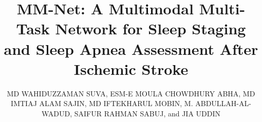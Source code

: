 \documentclass{ieeeaccess}
\begin{document}

\title{MM-Net: A Multimodal Multi-Task Network for Sleep Staging and Sleep Apnea Assessment After Ischemic Stroke}

\author{\uppercase{Md Wahiduzzaman Suva},
\uppercase{Esm-e Moula Chowdhury Abha},
\uppercase{Md Imtiaj Alam Sajin},
\uppercase{Md Iftekharul Mobin},
\uppercase{M. Abdullah-Al-Wadud}, \uppercase{Saifur Rahman Sabuj}, and \uppercase{Jia Uddin}}

\address[1]{Department of Computer Science and Engineering, American International University-Bangladesh, Dhaka 1229, Bangladesh (e-mail: 26-94088-2@student.aiub.edu, 26-94089-2@student.aiub.edu, 26-94090-2@student.aiub.edu, iftekhar.mobin@aiub.edu)}
\address[2]{Department of Software Engineering, College of Computer and Information Sciences, King Saud University, 11543, Riyadh, Saudi Arabia (e-mail: mwadud@ksu.edu.sa)}
\address[3]{Department of Automotive Engineering, Hanyang University, Seoul, 04763, South Korea (e-mail: s.r.sabuj@ieee.org)}
\address[4]{AI and Big Data Department, Woosong University, Daejeon, Republic of Korea (e-mail: jia.uddin@wsu.ac.kr)}

\titlepgskip=-21pt
\end{document}
